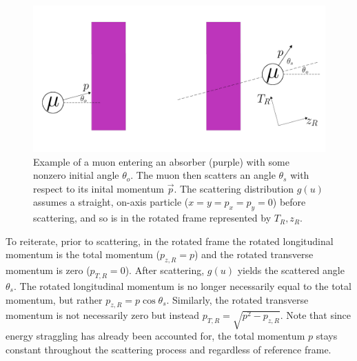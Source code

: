 \begin{figure}
  \centering
    \includegraphics[width=\textwidth]{Figures/cosyRotatedFrame} 
  \caption[Example of a muon entering an absorber with some nonzero initial angle.]{Example of a muon entering an absorber (purple) with some nonzero initial angle $\theta_o$. The muon then scatters an angle $\theta_s$ with respect to its inital momentum $\vec{p}$. The scattering distribution $g(u)$ assumes a straight, on-axis particle ($x=y=p_x=p_y=0$) before scattering, and so is in the rotated frame represented by $T_R, z_R$.}
  \label{fig:cosyRotatedFrame}
\end{figure}

To reiterate, prior to scattering, in the rotated frame the rotated longitudinal momentum is the total momentum ($p_{z,R}=p$) and the rotated transverse momentum is zero ($p_{T,R}=0$). After scattering, $g(u)$ yields the scattered angle $\theta_s$. The rotated longitudinal momentum is no longer necessarily equal to the total momentum, but rather $p_{z,R}=p\cos\theta_s$. Similarly, the rotated transverse momentum is not necessarily zero but instead $p_{T,R}=\sqrt{p^2-p_{z,R}}$. Note that since energy straggling has already been accounted for, the total momentum $p$ stays constant throughout the scattering process and regardless of reference frame.

